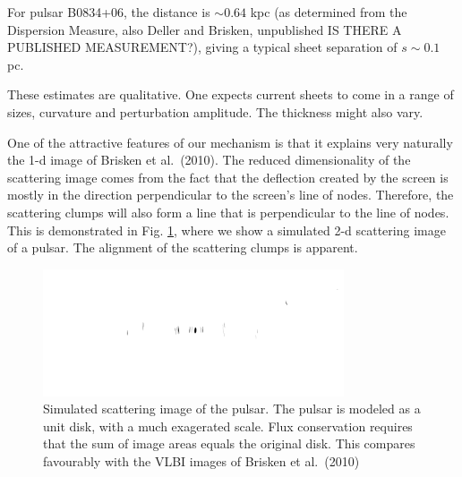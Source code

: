 \documentclass[useAMS,usenatbib]{mn2e}
\begin{document}
For pulsar B0834+06, the distance is $\sim 0.64$ kpc (as determined
from the Dispersion Measure, also Deller and Brisken, unpublished IS
THERE A PUBLISHED MEASUREMENT?), giving a typical sheet separation of
$s \sim 0.1$ pc.







These estimates are qualitative.  One expects current sheets to come
in a range of sizes, curvature and perturbation amplitude.  The
thickness might also vary.%

One of the attractive features of our mechanism is that it explains
very naturally the 1-d image of Brisken et al.~(2010). The reduced
dimensionality of the scattering image comes from the fact that the
deflection created by the screen is mostly in the direction
perpendicular to the screen's line of nodes. Therefore, the scattering
clumps will also form a line that is perpendicular to the line of
nodes. This is demonstrated in Fig. \ref{fig:2d}, where we show a simulated 2-d
scattering image of a pulsar. The alignment of the scattering clumps
is apparent.


\begin{figure}
\centerline{\includegraphics[width=3.5in]{image86r.png}}
\caption{Simulated scattering image of the pulsar.  The pulsar is
  modeled as a unit disk, with a much exagerated scale.  Flux
  conservation requires that the sum of image areas equals the
  original disk.
This compares favourably with the VLBI images of Brisken et al.~(2010)
}
\label{fig:2d}
\end{figure}
\end{document}
